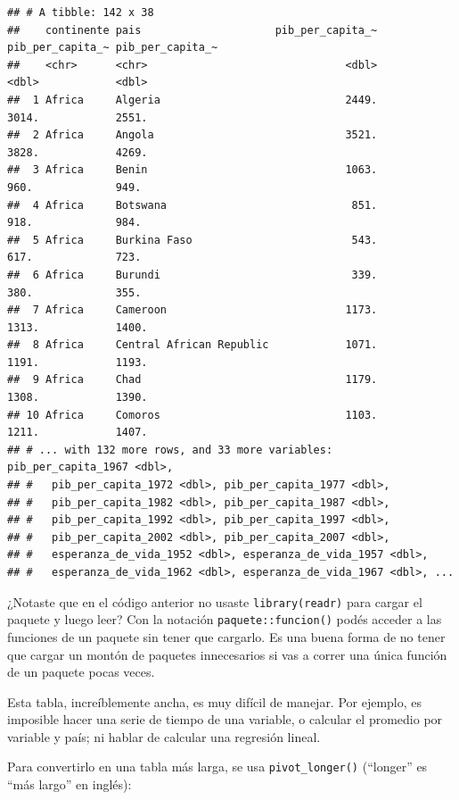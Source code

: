 \documentclass[
  openany]{book}
\begin{document}
\begin{verbatim}
## # A tibble: 142 x 38
##    continente pais                     pib_per_capita_~ pib_per_capita_~ pib_per_capita_~
##    <chr>      <chr>                               <dbl>            <dbl>            <dbl>
##  1 Africa     Algeria                             2449.            3014.            2551.
##  2 Africa     Angola                              3521.            3828.            4269.
##  3 Africa     Benin                               1063.             960.             949.
##  4 Africa     Botswana                             851.             918.             984.
##  5 Africa     Burkina Faso                         543.             617.             723.
##  6 Africa     Burundi                              339.             380.             355.
##  7 Africa     Cameroon                            1173.            1313.            1400.
##  8 Africa     Central African Republic            1071.            1191.            1193.
##  9 Africa     Chad                                1179.            1308.            1390.
## 10 Africa     Comoros                             1103.            1211.            1407.
## # ... with 132 more rows, and 33 more variables: pib_per_capita_1967 <dbl>,
## #   pib_per_capita_1972 <dbl>, pib_per_capita_1977 <dbl>,
## #   pib_per_capita_1982 <dbl>, pib_per_capita_1987 <dbl>,
## #   pib_per_capita_1992 <dbl>, pib_per_capita_1997 <dbl>,
## #   pib_per_capita_2002 <dbl>, pib_per_capita_2007 <dbl>,
## #   esperanza_de_vida_1952 <dbl>, esperanza_de_vida_1957 <dbl>,
## #   esperanza_de_vida_1962 <dbl>, esperanza_de_vida_1967 <dbl>, ...
\end{verbatim}

¿Notaste que en el código anterior no usaste \texttt{library(readr)} para cargar el paquete y luego leer?
Con la notación \texttt{paquete::funcion()} podés acceder a las funciones de un paquete sin tener que cargarlo.
Es una buena forma de no tener que cargar un montón de paquetes innecesarios si vas a correr una única función de un paquete pocas veces.

Esta tabla, increíblemente ancha, es muy difícil de manejar.
Por ejemplo, es imposible hacer una serie de tiempo de una variable, o calcular el promedio por variable y país; ni hablar de calcular una regresión lineal.

Para convertirlo en una tabla más larga, se usa \texttt{pivot\_longer()} (``longer'' es ``más largo'' en inglés):
\end{document}
